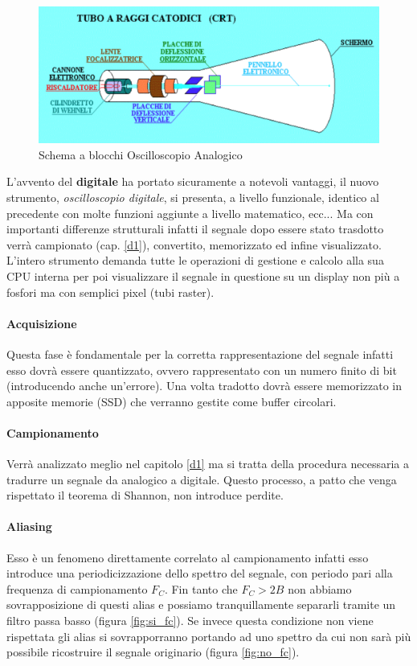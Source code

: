 \documentclass[12pt]{article}
\begin{document}
\begin{figure}[!hpt]
  \includegraphics[width=\textwidth]{images/osc_analog.png}
  \caption{Schema a blocchi Oscilloscopio Analogico}
  \label{fig:osc_analog}
\end{figure}

L'avvento del \textbf{digitale} ha portato sicuramente a notevoli vantaggi, il nuovo strumento, \textit{oscilloscopio digitale}, si presenta, a livello funzionale, identico al precedente con molte funzioni aggiunte a livello matematico, ecc... Ma con importanti differenze strutturali infatti il segnale dopo essere stato trasdotto verrà campionato (cap. \ref{d1}), convertito, memorizzato ed infine visualizzato.\\
L'intero strumento demanda tutte le operazioni di gestione e calcolo alla sua CPU interna per poi visualizzare il segnale in questione su un display non più a fosfori ma con semplici pixel (tubi raster).
\paragraph{Acquisizione} Questa fase è fondamentale per la corretta rappresentazione del segnale infatti esso dovrà essere quantizzato, ovvero rappresentato con un numero finito di bit (introducendo anche un'errore). Una volta tradotto dovrà essere memorizzato in apposite memorie (SSD) che verranno gestite come buffer circolari.
\paragraph{Campionamento} Verrà analizzato meglio nel capitolo \ref{d1} ma si tratta della procedura necessaria a tradurre un segnale da analogico a digitale. Questo processo, a patto che venga rispettato il teorema di Shannon, non introduce perdite.
\paragraph{Aliasing} Esso è un fenomeno direttamente correlato al campionamento infatti esso introduce una periodicizzazione dello spettro del segnale, con periodo pari alla frequenza di campionamento $F_{C}$. Fin tanto che $F_{C}>2B$ non abbiamo sovrapposizione di questi alias e possiamo tranquillamente separarli tramite un filtro passa basso (figura \ref{fig:si_fc}). Se invece questa condizione non viene rispettata gli alias si sovrapporranno portando ad uno spettro da cui non sarà più possibile ricostruire il segnale originario (figura \ref{fig:no_fc}).
\end{document}
